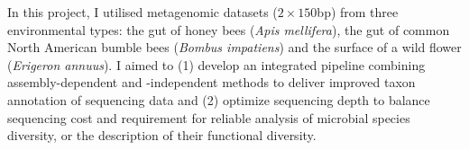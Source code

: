 \documentclass[11pt]{article}
\begin{document}
  \newline
  In this project, I utilised metagenomic datasets ($2 \times 150 $bp) from three environmental types: the gut of honey bees (\textit{Apis mellifera}), the gut of common North American bumble bees (\textit{Bombus impatiens}) and the surface of a wild flower (\textit{Erigeron annuus}). 
  I aimed to (1) develop an integrated pipeline combining assembly-dependent and -independent methods to deliver improved taxon annotation of sequencing data and (2) optimize sequencing depth to balance sequencing cost and requirement for reliable analysis of microbial species diversity, or the description of their functional diversity. 
\end{document}
